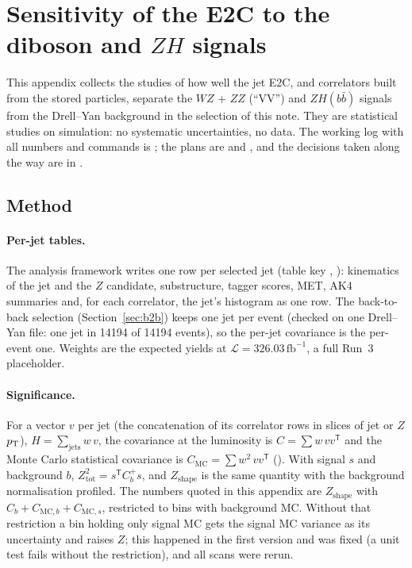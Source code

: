 \section{Sensitivity of the E2C to the diboson and $ZH$ signals}
\label{app:sens}

This appendix collects the studies of how well the jet E2C, and correlators built from the stored particles, separate
the $WZ$ + $ZZ$ (``VV'') and $ZH(b\bar b)$ signals from the Drell--Yan background in the selection of this note. They
are statistical studies on simulation: no systematic uncertainties, no data. The working log with all numbers and
commands is ; the plans are  and
, and the decisions taken along the way are in .

\subsection{Method}
\label{app:sens:method}

\paragraph{Per-jet tables.} The analysis framework writes one row per selected jet (table key ,
): kinematics of the jet and the $Z$ candidate, substructure, tagger scores, MET, AK4 summaries and,
for each correlator, the jet's histogram as one row. The back-to-back selection (Section~\ref{sec:b2b}) keeps one jet
per event (checked on one Drell--Yan file: one jet in 14194 of 14194 events), so the per-jet covariance is the per-event
one. Weights are the expected yields at $\mathcal{L} = 326.03\,\mathrm{fb}^{-1}$, a full Run~3 placeholder.

\paragraph{Significance.} For a vector $v$ per jet (the concatenation of its correlator rows in slices of jet or $Z$
$p_{\mathrm{T}}$), $H = \sum_\text{jets} w\,v$, the covariance at the luminosity is $C = \sum w\,v v^\mathsf{T}$ and the Monte Carlo
statistical covariance is $C_\mathrm{MC} = \sum w^2\,v v^\mathsf{T}$ (). With signal $s$ and
background $b$, $Z_\mathrm{tot}^2 = s^\mathsf{T} C_b^{+} s$, and $Z_\mathrm{shape}$ is the same quantity with the
background normalisation profiled. The numbers quoted in this appendix are $Z_\mathrm{shape}$ with
$C_b + C_{\mathrm{MC},b} + C_{\mathrm{MC},s}$, restricted to bins with background MC. Without that restriction a bin
holding only signal MC gets the signal MC variance as its uncertainty and raises $Z$; this happened in the first version
and was fixed (a unit test fails without the restriction), and all scans were rerun.

